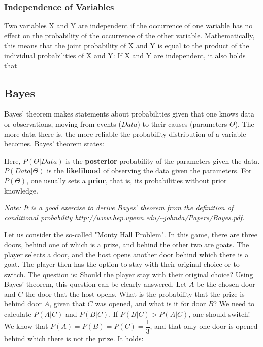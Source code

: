 \subsubsection{Independence of Variables}\label{Independence of Variables} 
Two variables X and Y are independent if the occurrence of one variable has no effect on the probability of the occurrence of the other variable. Mathematically, this means that the joint probability of X and Y is equal to the product of the individual probabilities of X and Y:
If X and Y are independent, it also holds that 

\subsection{Bayes}\label{Bayes}
Bayes' theorem makes statements about probabilities given that one knows data or observations, moving from events ($Data$) to their causes (parameters $\Theta$). The more data there is, the more reliable the probability distribution of a variable becomes. Bayes' theorem states:


Here, $P(\Theta|Data)$ is the \textbf{posterior} probability of the parameters given the data. $P(Data|\Theta)$ is the \textbf{likelihood} of observing the data given the parameters. For $P(\Theta)$, one usually sets a \textbf{prior}, that is, its probabilities without prior knowledge.

\emptyline
\textit{Note: It is a good exercise to derive Bayes' theorem from the definition of conditional probability \url{http://www.hep.upenn.edu/~johnda/Papers/Bayes.pdf}.}
\emptyline

Let us consider the so-called "Monty Hall Problem". In this game, there are three doors, behind one of which is a prize, and behind the other two are goats. The player selects a door, and the host opens another door behind which there is a goat. The player then has the option to stay with their original choice or to switch. The question is: Should the player stay with their original choice? Using Bayes' theorem, this question can be clearly answered.
Let $A$ be the chosen door and $C$ the door that the host opens. What is the probability that the prize is behind door $A$, given that $C$ was opened, and what is it for door $B$? We need to calculate $P(A|C)$ and $P(B|C)$. If $P(B|C) > P(A|C)$, one should switch! We know that $P(A) = P(B) = P(C) = \dfrac{1}{3}$, and that only one door is opened behind which there is not the prize. It holds:

